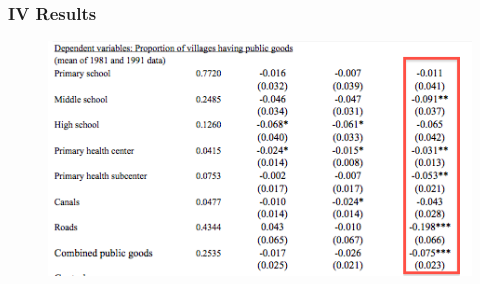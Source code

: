 \documentclass{beamer}
\begin{document}
\begin{frame}
  \frametitle{IV Results}
  \begin{figure}[t]
    \centering
      \includegraphics[scale=.7]{ivresults}
 \end{figure}
\end{frame}
\end{document}
